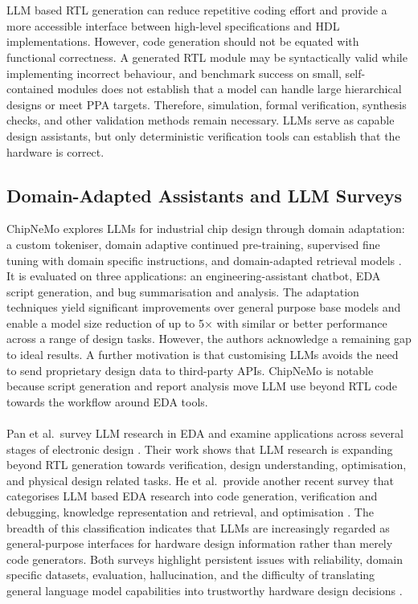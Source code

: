 \documentclass[conference]{IEEEtran}
\begin{document}
\\\\
\noindent LLM based RTL generation can reduce repetitive coding effort and provide a more accessible interface between high-level specifications and HDL implementations. However, code generation should not be equated with functional correctness. A generated RTL module may be syntactically valid while implementing incorrect behaviour, and benchmark success on small, self-contained modules does not establish that a model can handle large hierarchical designs or meet PPA targets. Therefore, simulation, formal verification, synthesis checks, and other validation methods remain necessary. LLMs serve as capable design assistants, but only deterministic verification tools can establish that the hardware is correct.

\subsection{Domain-Adapted Assistants and LLM Surveys}\label{L4}

\noindent ChipNeMo explores LLMs for industrial chip design through domain adaptation: a custom tokeniser, domain adaptive continued pre-training, supervised fine tuning with domain  specific instructions, and domain-adapted retrieval models \cite{P14_Liu2023ChipNeMo}. It is evaluated on three applications: an engineering-assistant chatbot, EDA script generation, and bug summarisation and analysis. The adaptation techniques yield significant improvements over general purpose base models and enable a model size reduction of up to 5× with similar or better performance across a range of design tasks. However, the authors acknowledge a remaining gap to ideal results. A further motivation is that customising LLMs avoids the need to send proprietary design data to third-party APIs. ChipNeMo is notable because script generation and report analysis move LLM use beyond RTL code towards the workflow around EDA tools.
\\\\
\noindent Pan et al.\ survey LLM research in EDA and examine applications across several stages of electronic design \cite{P6_Pan2025}. Their work shows that LLM research is expanding beyond RTL generation towards verification, design understanding, optimisation, and physical design related tasks. He et al.\ provide another recent survey that categorises LLM based EDA research into code generation, verification and debugging, knowledge representation and retrieval, and optimisation \cite{P7_He2025}. The breadth of this classification indicates that LLMs are increasingly regarded as general-purpose interfaces for hardware design information rather than merely code generators. Both surveys highlight persistent issues with reliability, domain specific datasets, evaluation, hallucination, and the difficulty of translating general language model capabilities into trustworthy hardware design decisions \cite{P6_Pan2025,P7_He2025}.
\end{document}
